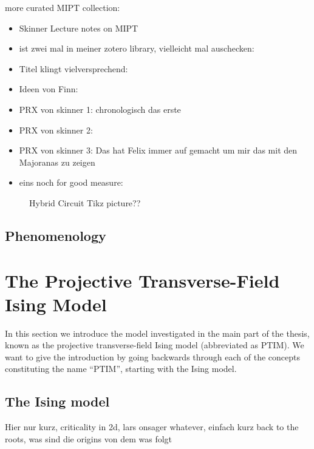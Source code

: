 more curated MIPT collection:
\begin{itemize}
  \item Skinner Lecture notes on MIPT
    \cite{skinnerLectureNotesIntroduction2023}
  \item ist zwei mal in meiner zotero library, vielleicht mal auschecken: 
    \cite{hokeMeasurementinducedEntanglementTeleportation2023}
  \item Titel klingt vielversprechend: \cite{baoTheoryPhaseTransition2020}
  \item Ideen von Finn: \cite{joshiObservingQuantumMpemba2024,aresEntanglementAsymmetryProbe2023}
  \item PRX von skinner 1: \cite{skinnerMeasurementInducedPhaseTransitions2019}
    chronologisch das erste
  \item PRX von skinner 2: \cite{nahumMeasurementEntanglementPhase2021}
  \item PRX von skinner 3:
    \cite{nahumEntanglementDynamicsDiffusionannihilation2020}
    Das hat Felix immer auf gemacht um mir das mit den Majoranas zu zeigen
  \item eins noch for good measure:
    \cite{yoshidaDecodingEntanglementStructure2021}
\end{itemize}
%  
\begin{figure}[H]
  \centering
  
  \caption{Hybrid Circuit Tikz picture??}
  \label{fig:hybrid-circuit}
\end{figure}

\subsection{Phenomenology}
\newpage
\section{The Projective Transverse-Field Ising Model}\label{sec:intro-ptim}
In this section we introduce the model investigated in the main part of the
thesis, known as the projective transverse-field Ising model (abbreviated as
PTIM). We want to give the introduction by going backwards through each of the
concepts constituting the name \enquote{PTIM}, starting with the Ising model.
\subsection{The Ising model}
Hier nur kurz, criticality in 2d, lars onsager whatever, einfach kurz back to
the roots, was sind die origins von dem was folgt
